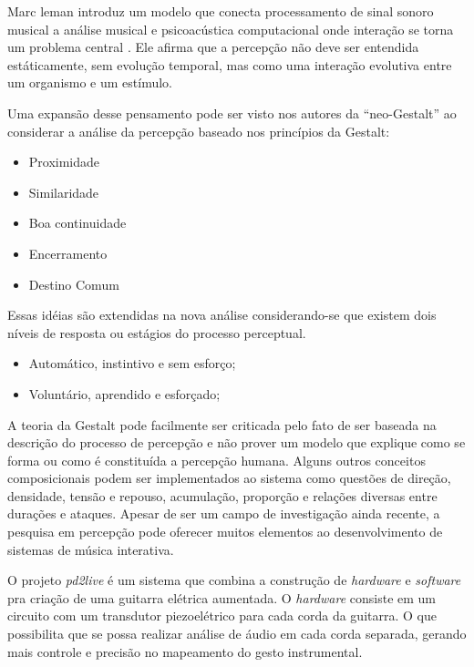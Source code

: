 \documentclass{ppgmus}
\begin{document}
Marc leman introduz um modelo que conecta processamento de 
sinal sonoro musical a análise musical e psicoacústica computacional onde interação
se torna um problema central \cite{leman96:gestalt}. Ele afirma que a percepção não deve ser entendida estáticamente,
sem evolução temporal, mas como uma interação evolutiva entre um organismo e um estímulo.

Uma expansão desse pensamento pode ser visto nos autores da ``neo-Gestalt'' ao considerar
a análise da percepção baseado nos princípios da Gestalt:
\begin{itemize}
 \item Proximidade
  \item Similaridade
  \item Boa continuidade
  \item Encerramento
  \item Destino Comum
\end{itemize}
Essas idéias são extendidas na nova análise considerando-se que existem dois níveis de
resposta ou estágios do processo perceptual.
\begin{itemize}
 \item Automático, instintivo e sem esforço;
  \item Voluntário, aprendido e esforçado;
\end{itemize}



A teoria da Gestalt pode facilmente ser criticada pelo fato de ser baseada na descrição
do processo de percepção e não prover um modelo que explique como se forma ou como é constituída 
a percepção humana. Alguns outros 
conceitos composicionais podem ser implementados ao sistema como questões de direção, densidade, tensão
e repouso, acumulação, proporção e relações diversas entre durações e ataques.
Apesar de ser um campo de investigação ainda recente, a pesquisa em percepção pode oferecer muitos elementos ao 
desenvolvimento de sistemas de música interativa.


O projeto \textit{pd2live} \cite{rickgrahan} é um sistema que combina a construção de \textit{hardware}
e \textit{software} pra criação de uma guitarra elétrica aumentada. O \textit{hardware} consiste
em um circuito com um transdutor piezoelétrico para cada corda da guitarra. O que possibilita que 
se possa realizar análise de áudio em cada corda separada, gerando mais controle e precisão
no mapeamento do gesto instrumental.
\end{document}
